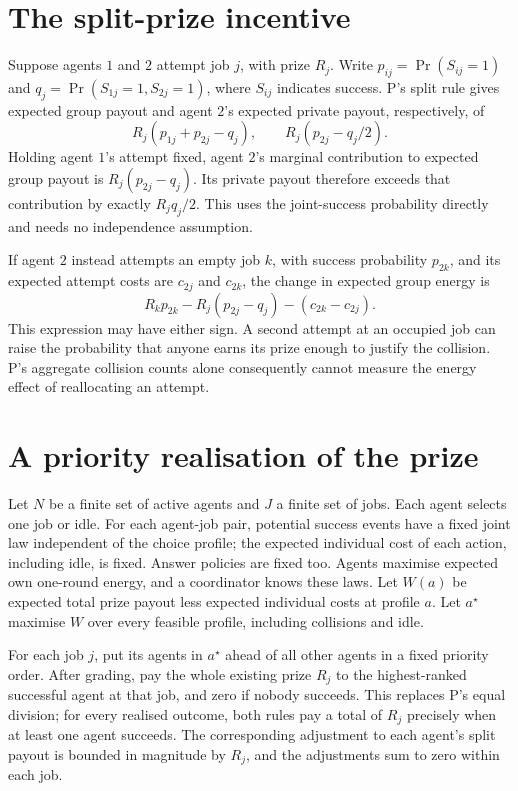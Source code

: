 \documentclass{article}
\begin{document}
\section{The split-prize incentive}

Suppose agents \(1\) and \(2\) attempt job \(j\), with prize \(R_j\). Write \(p_{ij}=\Pr(S_{ij}=1)\) and \(q_j=\Pr(S_{1j}=1,S_{2j}=1)\), where \(S_{ij}\) indicates success. P's split rule gives expected group payout and agent \(2\)'s expected private payout, respectively, of %
\[
R_j(p_{1j}+p_{2j}-q_j),
\qquad
R_j(p_{2j}-q_j/2).
\]
Holding agent \(1\)'s attempt fixed, agent \(2\)'s marginal contribution to expected group payout is \(R_j(p_{2j}-q_j)\). Its private payout therefore exceeds that contribution by exactly \(R_jq_j/2\). This uses the joint-success probability directly and needs no independence assumption. %

If agent \(2\) instead attempts an empty job \(k\), with success probability \(p_{2k}\), and its expected attempt costs are \(c_{2j}\) and \(c_{2k}\), the change in expected group energy is %
\[
R_kp_{2k}-R_j(p_{2j}-q_j)-(c_{2k}-c_{2j}).
\]
This expression may have either sign. A second attempt at an occupied job can raise the probability that anyone earns its prize enough to justify the collision. P's aggregate collision counts alone consequently cannot measure the energy effect of reallocating an attempt. %

\section{A priority realisation of the prize}

Let \(N\) be a finite set of active agents and \(J\) a finite set of jobs. Each agent selects one job or idle. For each agent-job pair, potential success events have a fixed joint law independent of the choice profile; the expected individual cost of each action, including idle, is fixed. Answer policies are fixed too. Agents maximise expected own one-round energy, and a coordinator knows these laws. Let \(W(a)\) be expected total prize payout less expected individual costs at profile \(a\). Let \(a^\star\) maximise \(W\) over every feasible profile, including collisions and idle. %

For each job \(j\), put its agents in \(a^\star\) ahead of all other agents in a fixed priority order. After grading, pay the whole existing prize \(R_j\) to the highest-ranked successful agent at that job, and zero if nobody succeeds. This replaces P's equal division; for every realised outcome, both rules pay a total of \(R_j\) precisely when at least one agent succeeds. The corresponding adjustment to each agent's split payout is bounded in magnitude by \(R_j\), and the adjustments sum to zero within each job. %
\end{document}
